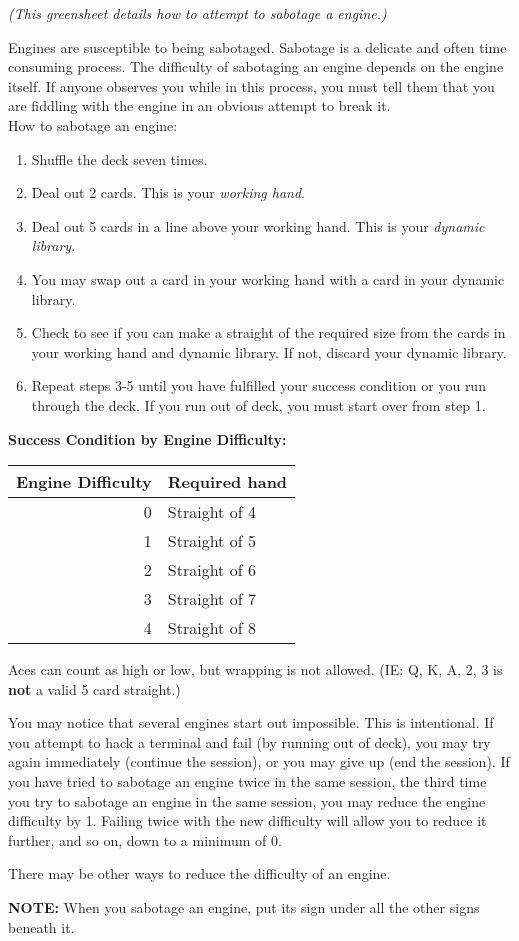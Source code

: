 \documentclass[green]{guildcamp4}
\begin{document}
\name{\gSabotage{}}

\emph{(This greensheet details how to attempt to sabotage a engine.)}

Engines are susceptible to being sabotaged. Sabotage is a delicate and often time consuming process. The difficulty of sabotaging an engine depends on the engine itself. If anyone observes you while in this process, you must tell them that you are fiddling with the engine in an obvious attempt to break it.\\

How to sabotage an engine:
\begin{enumerate}
	\item Shuffle the deck seven times.
	\item Deal out 2 cards. This is your {\em working hand}.
	\item Deal out 5 cards in a line above your working hand. This is your {\em dynamic library}.
	\item You may swap out a card in your working hand with a card in your dynamic library.
	\item Check to see if you can make a straight of the required size from the cards in your working hand and dynamic library. If not, discard your dynamic library.
	\item Repeat steps 3-5 until you have fulfilled your success condition or you run through the deck.  If you run out of deck, you must start over from step 1.
\end{enumerate}

{\bf Success Condition by Engine Difficulty:}\\

\begin{tabular}{||r|l||}
	\hline\hline
	Engine Difficulty	& Required hand\\
	\hline
	0	& Straight of 4\\
	1	& Straight of 5\\
	2	& Straight of 6\\
	3	& Straight of 7\\
	4	& Straight of 8\\
	\hline\hline 
\end{tabular}

\vspace{10 mm}

Aces can count as high or low, but wrapping is not allowed. (IE: Q, K, A, 2, 3 is {\bf not} a valid 5 card straight.)

You may notice that several engines start out impossible. This is intentional. If you attempt to hack a terminal and fail (by running out of deck), you may try again immediately (continue the session), or you may give up (end the session). If you have tried to sabotage an engine twice in the same session, the third time you try to sabotage an engine in the same session, you may reduce the engine difficulty by 1. Failing twice with the new difficulty will allow you to reduce it further, and so on, down to a minimum of 0.

There may be other ways to reduce the difficulty of an engine.

{\bf NOTE:} When you sabotage an engine, put its sign under all the other signs beneath it.
\end{document}

